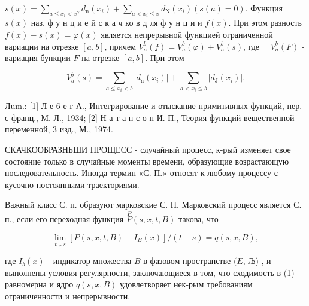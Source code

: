 \documentclass[10pt]{article}
\begin{document}
$s(x)=\sum_{a \leqslant x_{i}<x^{\gamma}} d_{\mathrm{n}}\left(x_{i}\right)+\sum_{a<x_{i} \leqslant x} d_{\mathrm{N}}\left(x_{i}\right)(s(a)=0)$. Функция $s(x)$ наз. ф у н ц и е й с к а ч ко в д ля ф у н ц и и $f(x)$. При этом разность $f(x)-s(x)=\varphi(x)$ является непрерывной функцией ограниченной вариации на отрезке $[a, b]$, причем $V_{a}^{b}(f)=V_{a}^{b}(\varphi)+V_{a}^{b}(s)$, где $\quad V_{a}^{b}(F)$ - вариация бункции $F$ на отрезке $[a, b]$. При этом



\[

V_{a}^{b}(s)=\sum_{a \leqslant x_{i}<b}\left|d_{\mathrm{n}}\left(x_{i}\right)\right|+\sum_{a<x_{i} \leqslant b}\left|d_{\mathrm{J}}\left(x_{i}\right)\right| .

\]



Лum.: [1] Л е 6 е г А., Интегрирование и отыскание примитивных функций, пер. с франц., М.-Л., 1934; [2] Н а т а н с о н И. П., Теория функций вещественной переменной, 3 изд., М., 1974.



СКАЧКООБРАЗНБШИ ПРОЩЕСС - случайный процесс, к-рый изменяет свое состояние только в случайные моменты времени, образующие возрастающую последовательность. Иногда термин «С. П.» относят к любому процессу с кусочно постоянными траекториями.



Важный класс С. п. образуют марковские С. П. Марковский процесс является С. п., если его переходная функция $\stackrel{P}{P}(s, x, t, B)$ такова, что



\[

\lim _{t \downarrow s}\left[P(s, x, t, B)-I_{B}(x)\right] /(t-s)=q(s, x, B),

\]



где $I_{b}(x)$ - индикатор множества $B$ в фазовом пространстве $(E$, Љ) , и выполнены условия регулярности, заключающиеся в том, что сходимость в (1) равномерна и ядро $q(s, x, B)$ удовлетворяет нек-рым требованиям ограниченности и непрерывности.
\end{document}
